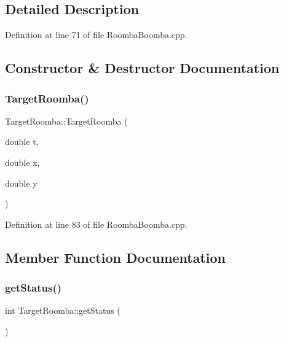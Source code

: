 \subsection{Detailed Description}


Definition at line 71 of file Roomba\+Boomba.\+cpp.



\subsection{Constructor \& Destructor Documentation}
\mbox{\label{classTargetRoomba_aa6fe7140d5d7df68e24a900e0622bd10}} 
\subsubsection{\texorpdfstring{TargetRoomba()}{TargetRoomba()}}
{\footnotesize\ttfamily Target\+Roomba\+::\+Target\+Roomba (\begin{DoxyParamCaption}\item[{double}]{t,  }\item[{double}]{x,  }\item[{double}]{y }\end{DoxyParamCaption})\hspace{0.3cm}{\ttfamily [inline]}}



Definition at line 83 of file Roomba\+Boomba.\+cpp.



\subsection{Member Function Documentation}
\mbox{\label{classTargetRoomba_afbd797189e498b8cacdb965fc866e353}} 
\subsubsection{\texorpdfstring{getStatus()}{getStatus()}}
{\footnotesize\ttfamily int Target\+Roomba\+::get\+Status (\begin{DoxyParamCaption}{ }\end{DoxyParamCaption})\hspace{0.3cm}{\ttfamily [inline]}}



